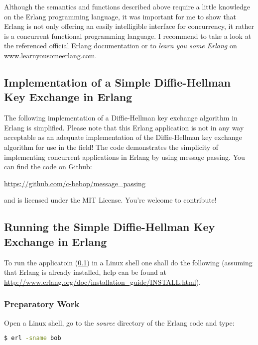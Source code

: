\documentclass[xcolor=dvipsnames]{article}
\begin{document}
\noindent Although the semantics and functions described above require a little knowledge on the Erlang programming language, it was important for me to show that Erlang is not only offering an easily intelligible interface for concurrency, it rather is a concurrent functional programming language. I recommend to take a look at the referenced official Erlang documentation or to \textit{learn you some Erlang} on \url{www.learnyousomeerlang.com}.

\subsection{Implementation of a Simple Diffie-Hellman Key Exchange in Erlang} \label{erlang_implementation}

The following implementation of a Diffie-Hellman key exchange algorithm in Erlang is simplified. Please note that this Erlang application is not in any way acceptable as an adequate implementation of the Diffie-Hellman key exchange algorithm for use in the field! The code demonstrates the simplicity of implementing concurrent applications in Erlang by using message passing. You can find the code on Github:

\begin{center}
\url{https://github.com/c-bebop/message_passing}
\end{center}

\noindent and is licensed under the MIT License. You're welcome to contribute!



\subsection{Running the Simple Diffie-Hellman Key Exchange in Erlang}

To run the applicatoin (\ref{erlang_implementation}) in a Linux shell one shall do the following (assuming that Erlang is already installed, help can be found at \url{http://www.erlang.org/doc/installation_guide/INSTALL.html}).

\subsubsection{Preparatory Work}

\noindent Open a Linux shell, go to the \textit{source} directory of the Erlang code and type:

\begin{lstlisting}[language=bash]
$ erl -sname bob
\end{lstlisting}
\end{document}
